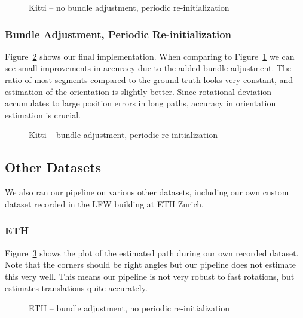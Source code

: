 \documentclass[11pt]{article}
\newlength\figureheight
\newlength\figurewidth
\begin{document}
\begin{figure}[h]
	\centering
	\setlength\figureheight{8cm} 
	\setlength\figurewidth{11cm}
	
	\caption{Kitti -- no bundle adjustment, periodic re-initialization}
	\label{fig:Kitti_entire_no_BA_reinit_thin}
\end{figure}

\subsubsection{Bundle Adjustment, Periodic Re-initialization}
Figure~\ref{fig:Kitti_entire_BA_reinit_thin} shows our final implementation. When comparing to Figure~\ref{fig:Kitti_entire_no_BA_reinit_thin} we can see small improvements in accuracy due to the added bundle adjustment. The ratio of most segments compared to the ground truth looks very constant, and estimation of the orientation is slightly better. Since rotational deviation accumulates to large position errors in long paths, accuracy in orientation estimation is crucial.

\begin{figure}[h]
	\centering
	\setlength\figureheight{8cm} 
	\setlength\figurewidth{11cm}
	
	\caption{Kitti -- bundle adjustment, periodic re-initialization}
	\label{fig:Kitti_entire_BA_reinit_thin}
\end{figure}

\subsection{Other Datasets}
We also ran our pipeline on various other datasets, including our own custom dataset recorded in the LFW building at ETH Zurich.

\subsubsection{ETH}
Figure~\ref{fig:ETH_BA_no_reinit} shows the plot of the estimated path during our own recorded dataset. Note that the corners should be right angles but our pipeline does not estimate this very well. This means our pipeline is not very robust to fast rotations, but estimates translations quite accurately.

\begin{figure}[h]
	\centering
	\setlength\figureheight{8cm} 
	\setlength\figurewidth{10cm}
	
	\caption{ETH -- bundle adjustment, no periodic re-initialization}
	\label{fig:ETH_BA_no_reinit}
\end{figure}
\end{document}
